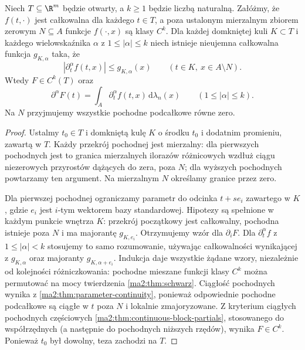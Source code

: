 \begin{twierdzenie}
\label{ma2:thm:parameter-multivariate}
Niech $T\subseteq\R^m$ będzie otwarty,
a $k\ge1$ będzie liczbą naturalną.
Załóżmy, że $f(t,\cdot)$ jest całkowalna dla każdego
$t\in T$, a poza ustalonym mierzalnym zbiorem zerowym
$N\subseteq A$ funkcje $f(\cdot,x)$ są klasy $C^k$.
Dla każdej domkniętej kuli $K\subset T$
i każdego wielowskaźnika $\alpha$ z
$1\le|\alpha|\le k$ niech istnieje nieujemna
całkowalna funkcja $g_{K,\alpha}$ taka, że
\[
 |\partial_t^\alpha f(t,x)|\le g_{K,\alpha}(x)
 \qquad(t\in K,\ x\in A\setminus N).
\]
Wtedy $F\in C^k(T)$ oraz
\[
 \partial^\alpha F(t)=\int_A \partial_t^\alpha f(t,x)
 \,\mathrm d\lambda_n(x)
 \qquad (1\le|\alpha|\le k).
\]
Na $N$ przyjmujemy wszystkie pochodne podcałkowe
równe zero.
\end{twierdzenie}
\begin{proof}
Ustalmy $t_0\in T$ i domkniętą kulę $K$
o środku $t_0$ i dodatnim promieniu, zawartą w $T$.
Każdy przekrój pochodnej jest mierzalny: dla
pierwszych pochodnych jest to granica mierzalnych
ilorazów różnicowych wzdłuż ciągu niezerowych
przyrostów dążących do zera, poza $N$; dla wyższych
pochodnych powtarzamy ten argument.
Na mierzalnym $N$ określamy granice przez zero.

Dla pierwszej pochodnej ograniczamy parametr do
odcinka $t+s e_i$ zawartego w $K$, gdzie $e_i$
jest $i$-tym wektorem bazy standardowej.
Hipotezy
są spełnione w każdym punkcie wnętrza $K$:
przekrój początkowy jest całkowalny, pochodna
istnieje poza $N$ i ma majorantę $g_{K,e_i}$.
Otrzymujemy wzór dla $\partial_i F$.
Dla $\partial_t^\alpha f$ z $1\le|\alpha|<k$
stosujemy to samo rozumowanie, używając
całkowalności wynikającej z $g_{K,\alpha}$
oraz majoranty $g_{K,\alpha+e_i}$.
Indukcja daje wszystkie żądane wzory, niezależnie
od kolejności różniczkowania: pochodne mieszane
funkcji klasy $C^k$ można permutować na mocy
twierdzenia \ref{ma2:thm:schwarz}.
Ciągłość pochodnych wynika z
\ref{ma2:thm:parameter-continuity}, ponieważ
odpowiednie pochodne podcałkowe są ciągłe w $t$
poza $N$ i lokalnie zmajoryzowane.
Z kryterium ciągłych pochodnych częściowych
\ref{ma2:thm:continuous-block-partials},
stosowanego do współrzędnych (a następnie do
pochodnych niższych rzędów), wynika $F\in C^k$.
Ponieważ
$t_0$ był dowolny, teza zachodzi na $T$.
\end{proof}

